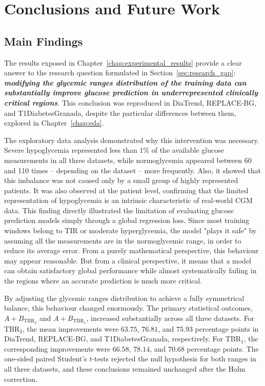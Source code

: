 \chapter{Conclusions and Future Work}

\section{Main Findings}
\label{sec:main_findings}

The results exposed in Chapter~\ref{chap:experimental_results} provide a clear answer to the research question formulated in Section~\ref{sec:research_gap}:\textbf{\textit{ modifying the glycemic ranges distribution of the training data can substantially improve glucose prediction in underrepresented clinically critical regions}}. This conclusion was reproduced in DiaTrend, REPLACE-BG, and T1DiabetesGranada, despite the particular differences between them, explored in Chapter~\ref{chap:eda}.

The exploratory data analysis demonstrated why this intervention was necessary. Severe hypoglycemia represented less than \(1\%\) of the available glucose measurements in all three datasets, while normoglycemia appeared between 60 and 110 times -- depending on the dataset -- more frequently. Also, it showed that this imbalance was not caused only by a small group of highly represented patients. It was also observed at the patient level, confirming that the limited representation of hypoglycemia is an intrinsic characteristic of real-world CGM data. This finding directly illustrated the limitation of evaluating glucose prediction models simply through a global regression loss. Since most training windows belong to TIR or moderate hyperglycemia, the model "plays it safe" by assuming all the measurements are in the normoglycemic range, in order to reduce its average error. From a purely mathematical perspective, this behaviour may appear reasonable. But from a clinical perspective, it means that a model can obtain satisfactory global performance while almost systematically failing in the regions where an accurate prediction is much more critical.

By adjusting the glycemic ranges distribution to achieve a fully symmetrical balance, this behaviour changed enormously. The primary statistical outcomes, \(A+B_{\mathrm{TBR_2}}\) and \(A+B_{\mathrm{TBR_1}}\), increased substantially across all three datasets. For TBR$_2$, the mean improvements were \(63.75\), \(76.81\), and \(75.93\) percentage points in DiaTrend, REPLACE-BG, and T1DiabetesGranada, respectively. For TBR$_1$, the corresponding improvements were \(66.58\), \(78.14\), and \(70.68\) percentage points. The one-sided paired Student's \(t\)-tests rejected the null hypothesis for both ranges in all three datasets, and these conclusions remained unchanged after the Holm correction.

